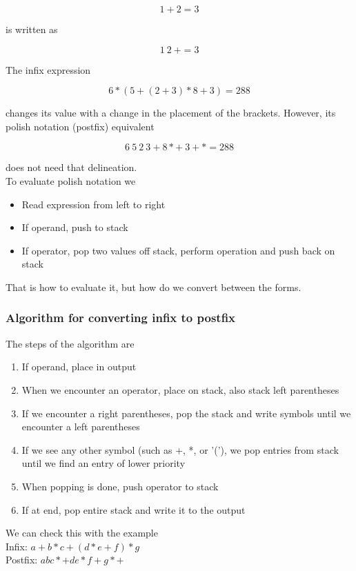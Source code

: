 \documentclass[]{article}
\begin{document}
\[1 + 2 = 3\]

is written as 

\[1~2~+=3\]

The infix expression 

\[6*(5+(2+3) * 8 + 3) = 288\]

changes its value with a change in the placement of the brackets. However, its polish notation (postfix) equivalent

\[6~5~2~3+8*+~3+*=288\]

does not need that delineation.\\

To evaluate polish notation we
\begin{itemize}
	\item Read expression from left to right
	\item If operand, push to stack
	\item If operator, pop two values off stack, perform operation and push back on stack
\end{itemize}\bigbreak

That is how to evaluate it, but how do we convert between the forms.

\subsubsection{Algorithm for converting infix to postfix}\bigbreak

The steps of the algorithm are
\begin{enumerate}
	\item If operand, place in output
	\item When we encounter an operator, place on stack, also stack left parentheses
	\item If we encounter a right parentheses, pop the stack and write symbols until we encounter a left parentheses
	\item If we see any other symbol (such as +, *, or '('), we pop entries from stack until we find an entry of lower priority
	\item When popping is done, push operator to stack 
	\item If at end, pop entire stack and write it to the output
\end{enumerate}\bigbreak

We can check this with the example\\

Infix: $a + b * c + (d*e + f) * g$\\
Postfix: $abc*+de*f+g*+$\\
\end{document}
